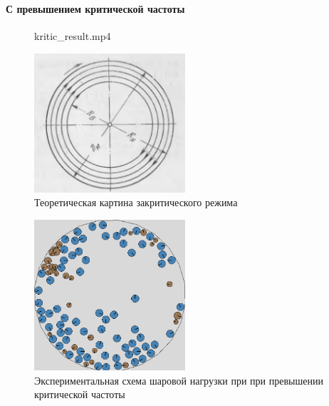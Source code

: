 \documentclass[c]{beamer}  %
\begin{document}
\begin{frame}
\frametitle{\insertsection} 
\framesubtitle{С превышением критической частоты}
\begin{figure}[ht]
     		{kritic_result.mp4}
\end{figure}


{
\begin{figure}[H]
	\centering
	\includegraphics[width=0.5\textwidth]{kritic_theory} 
	\caption{Теоретическая картина закритического режима}
\end{figure}
}
{
\begin{figure}[H]
	\centering
	\includegraphics[width=0.5\textwidth]{kritic_result} 
	\caption{Экспериментальная схема шаровой нагрузки при при превышении критической частоты}
	\label{pic:kritic_result}
\end{figure} 
}
{

}
\end{frame}
\end{document}
